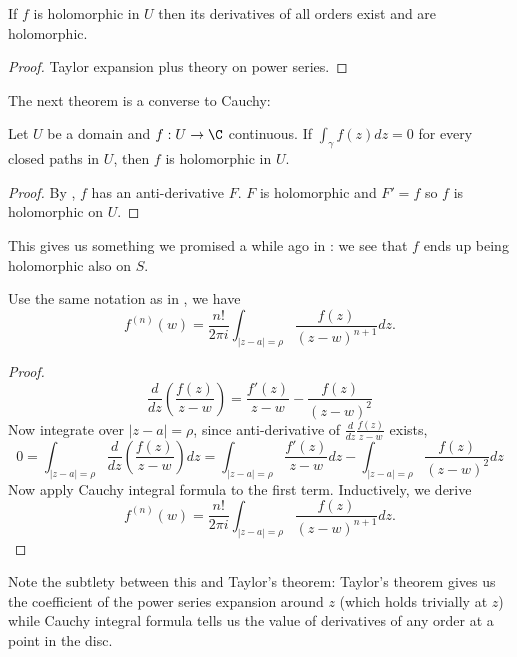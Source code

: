 \documentclass[a4paper]{article}
\begin{document}
\begin{corollary}
  If \(f\) is holomorphic in \(U\) then its derivatives of all orders exist and are holomorphic.
\end{corollary}

\begin{proof}
  Taylor expansion plus theory on power series.
\end{proof}

The next theorem is a converse to Cauchy:

\begin{corollary}[Morera]
  \label{cor:Morera}
  Let \(U\) be a domain and \(f: U \to \C\) continuous. If \(\int_\gamma f(z) dz = 0\) for every closed paths in \(U\), then \(f\) is holomorphic in \(U\).
\end{corollary}

\begin{proof}
  By , \(f\) has an anti-derivative \(F\). \(F\) is holomorphic and \(F' = f\) so \(f\) is holomorphic on \(U\).
\end{proof}

This gives us something we promised a while ago in : we see that \(f\) ends up being holomorphic also on \(S\).

\begin{proposition}
  Use the same notation as in , we have
  \[
    f^{(n)}(w) = \frac{n!}{2\pi i} \int_{|z - a| = \rho} \frac{f(z)}{(z - w)^{n + 1}} dz.
  \]
\end{proposition}

\begin{proof}
\[
  \frac{d}{dz} \left( \frac{f(z)}{z - w} \right)
  = \frac{f'(z)}{z - w} - \frac{f(z)}{(z - w)^2}
\]
Now integrate over \(|z - a| = \rho\), since anti-derivative of \(\frac{d}{dz} \frac{f(z)}{z - w}\) exists,
\[
  0 = \int_{|z - a| = \rho}  \frac{d}{dz} \left( \frac{f(z)}{z - w} \right)dz
  = \int_{|z - a| = \rho} \frac{f'(z)}{z - w} dz - \int_{|z - a| = \rho} \frac{f(z)}{(z - w)^2} dz
\]
Now apply Cauchy integral formula to the first term. Inductively, we derive
\[
  f^{(n)}(w) = \frac{n!}{2\pi i} \int_{|z - a| = \rho} \frac{f(z)}{(z - w)^{n + 1}} dz.
\]
\end{proof}

Note the subtlety between this and Taylor's theorem: Taylor's theorem gives us the coefficient of the power series expansion around \(z\) (which holds trivially at \(z\)) while Cauchy integral formula tells us the value of derivatives of any order at a point in the disc.
\end{document}
